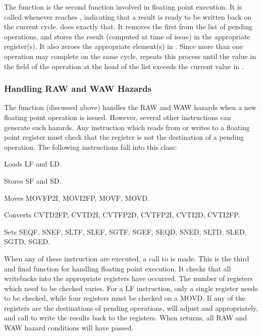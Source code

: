 The function  is the second function involved in
floating point execution.  It is called whenever  reaches
, indicating that a result is ready to be written back on the
current cycle.   does exactly that.  It removes the
first  from the list of pending operations, and stores the
result (computed at time of issue) in the appropriate register(s).  It also
zeroes the appropriate element(s) in .  Since more than
one operation may complete on the same cycle,  repeats
this process until the value in the  field of the operation
at the head of the list exceeds the current value in .

\subsubsection{Handling RAW and WAW Hazards}

The function  (discussed above) handles the RAW and WAW 
hazards when a new floating point operation is issued.  However, several other
instructions can generate such hazards.  Any instruction which reads from or
writes to a floating point register must check that the register is not the
destination of a pending operation.  The following instructions fall into
this class:
\begin{mylist}
  \item[Loads \hfill]  LF and LD.
  \item[Stores \hfill] SF and SD.
  \item[Moves \hfill] MOVFP2I, MOVI2FP, MOVF, MOVD.
  \item[Converts \hfill] CVTD2FP, CVTD2I, CVTFP2D, CVTFP2I, CVTI2D, CVTI2FP.
  \item[Sets \hfill] SEQF, SNEF, SLTF, SLEF, SGTF, SGEF, SEQD, SNED, SLTD, SLED, 
   SGTD, SGED.
\end{mylist}
When any of these instruction are executed, a call to  is made.
This is the third and final function for handling floating point execution.
It checks that all writebacks into the appropriate registers have occurred.
The number of registers which need to be checked varies.  For a LF 
instruction, only a single register needs to be checked, while four registers
must be checked on a MOVD.  If any of the registers are the destinations
of pending operations,  will adjust  and
 appropriately, and call  to write the
results back to the registers.  When  returns, all RAW and WAW
hazard conditions will have passed.
